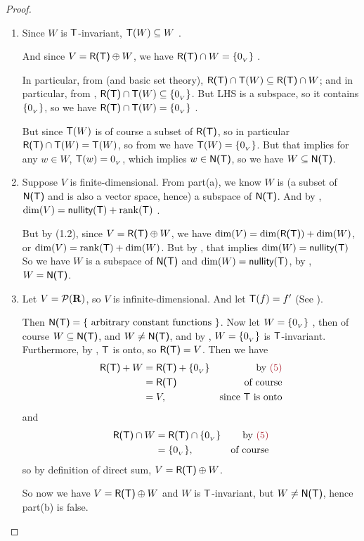 \begin{proof} \ 
\begin{enumerate}
\item Since \(W\) is \(\textsf{T}\)-invariant, \(\textsf{T}(W) \subseteq W\) .

    And since \(V = \textsf{R(T)} \oplus W\), we have \(\textsf{R(T)}{} \cap W = \{ 0_{_V} \}\) .

    In particular, from  (and basic set theory), \(\textsf{R(T)}{} \cap \textsf{T}(W) \subseteq \textsf{R(T)}{} \cap W\);
    and in particular, from \MAROON{(2)}, \(\textsf{R(T)}{} \cap \textsf{T}(W) \subseteq \{ 0_{_V} \}\).
    But LHS is a subspace, so it contains \(\{ 0_{_V} \}\), so we have \(\textsf{R(T)}{} \cap \textsf{T}(W) = \{ 0_{_V} \}\) .

    But since \(\textsf{T}(W)\) is of course a subset of \(\textsf{R(T)}\), so in particular \(\textsf{R(T)}{} \cap \textsf{T}(W) = \textsf{T}(W)\), so from  we have \(\textsf{T}(W) = \{ 0_{_V} \}\).
    But that implies for any \(w \in W\), \(\textsf{T}(w) = 0_{_V}\), which implies \(w \in \textsf{N(T)}\), so we have \(W \subseteq \textsf{N(T)}\).

\item Suppose \(V\) is finite-dimensional.
    From part(a), we know \(W\) is (a subset of \(\textsf{N(T)}\) and is also a vector space, hence) a subspace of \(\textsf{N(T)}\).
    And by \THM{2.3}, \(\dim(V) = \textsf{nullity}(\textsf{T}) + \mathrm{rank}(\textsf{T})\) .

    But by (1.2), since \(V = \textsf{R(T)} \oplus W\), we have \(\dim(V) = \dim(\textsf{R(T)}) + \dim(W)\), or \(\dim(V) = \mathrm{rank}(\textsf{T}) + \dim(W)\).
    But by \MAROON{(4)}, that implies \(\dim(W) = \textsf{nullity}(\textsf{T})\)
    So we have \(W\) is a subspace of \(\textsf{N(T)}\) and \(\dim(W) = \textsf{nullity}(\textsf{T})\), by , \(W = \textsf{N(T)}\).

\item Let \(V = \mathcal{P}(\mathbf{R})\), so \(V\) is infinite-dimensional.
    And let \(\textsf{T}(f) = f'\) (See \EXEC{2.1.16}).

    Then \(\textsf{N(T)} = \{ \text{ arbitrary constant functions } \}\).
    Now let \(W = \{ 0_{_V} \}\) \MAROON{(5)}, then of course \(W \subseteq \textsf{N(T)}\), and \(W \ne \textsf{N(T)}\), and by , \(W = \{ 0_{_V} \}\) is \(\textsf{T}\)-invariant.
    Furthermore, by \EXEC{2.1.16}, \(\textsf{T}\) is onto, so \(\textsf{R(T)} = V\).
    Then we have
    \begin{align*}
        \RANGET + W & = \RANGET + \{ \OV \} & \text{by \MAROON{(5)}} \\
                    & = \RANGET & \text{of course} \\
                    & = V, & \text{since \(\T\) is onto} 
    \end{align*}
    and
    \begin{align*}
        \RANGET \cap W & = \RANGET \cap \{ \OV \} & \text{by \MAROON{(5)}} \\
                       & = \{ \OV \}, & \text{of course}
    \end{align*}
    so by definition of direct sum, \(V = \textsf{R(T)} \oplus W\).

    So now we have \(V = \textsf{R(T)} \oplus W\) and \(W\) is \(\textsf{T}\)-invariant, but \(W \ne \textsf{N(T)}\), hence part(b) is false.
\end{enumerate}
\end{proof}

